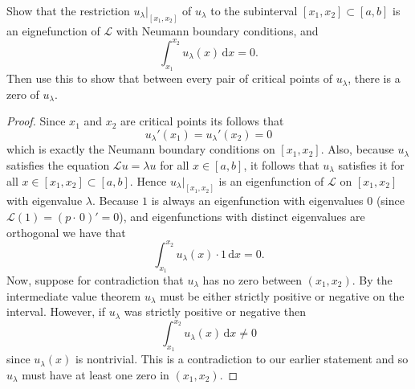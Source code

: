 \documentclass{exam}
\begin{document}
\begin{questions}
        \question Show that the restriction $u_{\lambda}|_{[x_1, x_2]}$ of $u_\lambda$ to the subinterval $[x_1, x_2] \subset [a, b]$ is an eignefunction of $\mathcal{L}$ with Neumann boundary conditions, and 
        \[
            \int_{x_1}^{x_2} u_\lambda(x)\,\mathrm{d}x = 0. 
        \]
        Then use this to show that between every pair of critical points of $u_\lambda$, there is a zero of $u_\lambda$.
        \begin{solution}
            \begin{proof}
                Since $x_1$ and $x_2$ are critical points its follows that
                \[
                    u_\lambda'(x_1) = u_\lambda'(x_2) = 0 
                \]
                which is exactly the Neumann boundary conditions on $[x_1, x_2]$. Also, because $u_\lambda$ satisfies the equation $\mathcal{L}u = \lambda u$ for all $x \in [a, b]$, it follows that $u_\lambda$ satisfies it for all $x \in [x_1, x_2] \subset [a, b]$. Hence $u_\lambda|_{[x_1, x_2]}$ is an eigenfunction of $\mathcal{L}$ on $[x_1, x_2]$ with eigenvalue $\lambda$. Because $1$ is always an eigenfunction with eigenvalues $0$ (since $\mathcal{L}(1) = (p\cdot\,0)' = 0$), and eigenfunctions with distinct eigenvalues are orthogonal we have that 
                \[
                    \int_{x_1}^{x_2} u_\lambda(x) \cdot 1 \,\mathrm{d}x = 0.
                \]
                Now, suppose for contradiction that $u_\lambda$ has no zero between $(x_1, x_2)$. By the intermediate value theorem $u_\lambda$ must be either strictly positive or negative on the interval. However, if $u_\lambda$ was strictly positive or negative then 
                \[
                    \int_{x_1}^{x_2} u_\lambda(x) \,\mathrm{d}x \neq 0 
                \]
                since $u_\lambda(x)$ is nontrivial. This is a contradiction to our earlier statement and so $u_\lambda$ must have at least one zero in $(x_1, x_2)$.
            \end{proof}
        \end{solution}


\end{questions}
\end{document}
